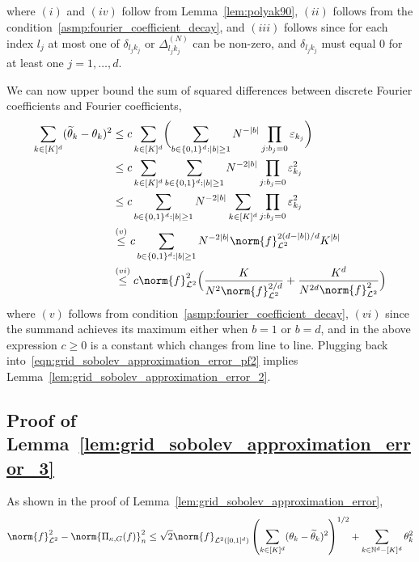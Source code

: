 \documentclass{article}
\newcommand{\abs}[1]{\left \lvert #1 \right \rvert}
\newcommand{\1}{\mathbf{1}}
\newcommand{\Leb}{\mathcal{L}}
\newcommand{\wt}[1]{\widetilde{#1}}
\theoremstyle{alden}
\theoremstyle{aldenthm}
\theoremstyle{definition}
\theoremstyle{remark}
\begin{document}
where $(i)$ and $(iv)$ follow from Lemma~\ref{lem:polyak90}, $(ii)$ follows from the condition~\eqref{asmp:fourier_coefficient_decay}, and $(iii)$ follows since for each index $l_j$ at most one of $\delta_{l_j k_j}$ or $\Delta_{l_j k_j}^{(N)}$ can be non-zero, and $\delta_{l_j k_j}$ must equal $0$ for at least one $j = 1,\ldots,d$. 

We can now upper bound the sum of squared differences between discrete Fourier coefficients and Fourier coefficients,
\begin{align*}
\sum_{k \in [K]^d} (\wt{\theta}_k - \theta_k)^2 & \leq c \sum_{k \in [K]^d} \biggl(\sum_{b \in \{0,1\}^d : \abs{b} \geq 1} N^{-\abs{b}} \prod_{j: b_j = 0} \varepsilon_{k_j} \biggr) \\
& \leq c \sum_{k \in [K]^d} \sum_{b \in \{0,1\}^d : \abs{b} \geq 1} N^{-2\abs{b}} \prod_{j: b_j = 0} \varepsilon_{k_j}^2 \\
& \leq c \sum_{b \in \{0,1\}^d : \abs{b} \geq 1} N^{-2\abs{b}} \sum_{k \in [K]^d} \prod_{j: b_j = 0} \varepsilon_{k_j}^2 \\
& \overset{(v)}{\leq} c \sum_{b \in \{0,1\}^d : \abs{b} \geq 1} N^{-2\abs{b}} \norm{f}_{\Leb^2}^{2(d - \abs{b})/d} K^{\abs{b}} \\
& \overset{(vi)}{\leq} c \norm{f}_{\Leb^2}^2 \Bigl( \frac{K}{N^2 \norm{f}_{\Leb^2}^{2/d}} + \frac{K^d}{N^{2d} \norm{f}_{\Leb^2}^{2}} \Bigr)
\end{align*}
where $(v)$ follows from condition~\eqref{asmp:fourier_coefficient_decay}, $(vi)$ since the summand achieves its maximum either when $b = 1$ or $b = d$, and in the above expression $c \geq 0$ is a constant which changes from line to line. Plugging back into~\eqref{eqn:grid_sobolev_approximation_error_pf2} implies Lemma~\ref{lem:grid_sobolev_approximation_error_2}.

\subsection{Proof of Lemma~\ref{lem:grid_sobolev_approximation_error_3}}
As shown in the proof of Lemma~\ref{lem:grid_sobolev_approximation_error}, 
\begin{equation}
\norm{f}_{\Leb^2}^2 - \norm{\Pi_{\kappa,G}(f)}_n^2 \leq \sqrt{2} \norm{f}_{\Leb^2([0,1]^d)} \left(\sum_{k \in [K]^d} (\theta_k - \wt{\theta}_k)^2\right)^{1/2} + \sum_{k \in \mathbb{N}^d - [K]^d} \theta_k^2 \label{eqn:grid_sobolev_approximation_error_3_pf1}
\end{equation}
\end{document}
